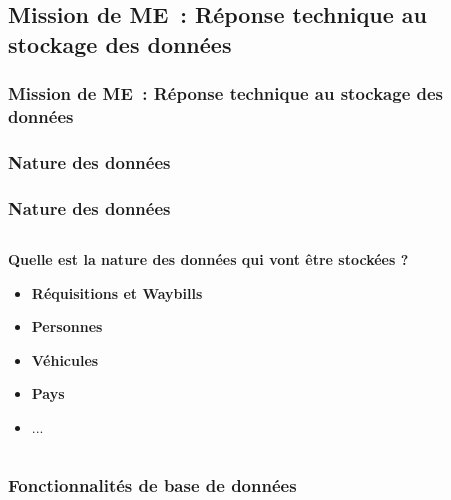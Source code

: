\subsection{Mission de ME~: Réponse technique au stockage des données}
\begin{frame}
	\frametitle{Mission de ME~: Réponse technique au stockage des données}
\end{frame}



\subsubsection[Nature des données]{Nature des données}

\begin{frame}
\frametitle{Nature des données}
\begin{columns}[c]
\begin{column}{12cm}
\begin{block}{\textbf{Quelle est la nature des données qui vont être stockées ?}}
\begin{itemize}
\item<2-> \textbf{Réquisitions et Waybills}
\item<3-> \textbf{Personnes}
\item<4-> \textbf{Véhicules}
\item<5-> \textbf{Pays}
\item<6-> ...
\end{itemize}
\end{block}
\end{column}
\end{columns}
\end{frame}

\subsubsection[Fonctionnalités de base de données]{Fonctionnalités de base de données}

